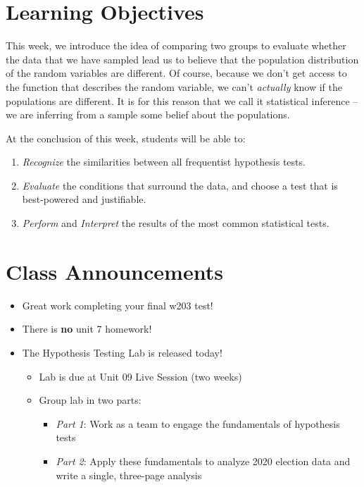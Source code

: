 \documentclass[
]{book}
\providecommand{\tightlist}{%
  \setlength{\itemsep}{0pt}\setlength{\parskip}{0pt}}
\theoremstyle{definition}
\theoremstyle{definition}
\theoremstyle{definition}
\theoremstyle{definition}
\theoremstyle{remark}
\begin{document}
\section{Learning Objectives}\label{learning-objectives-6}

This week, we introduce the idea of comparing two groups to evaluate whether the data that we have sampled lead us to believe that the population distribution of the random variables are different. Of course, because we don't get access to the function that describes the random variable, we can't \emph{actually} know if the populations are different. It is for this reason that we call it statistical inference -- we are inferring from a sample some belief about the populations.

At the conclusion of this week, students will be able to:

\begin{enumerate}
\def\labelenumi{\arabic{enumi}.}
\tightlist
\item
  \emph{Recognize} the similarities between all frequentist hypothesis tests.
\item
  \emph{Evaluate} the conditions that surround the data, and choose a test that is best-powered and justifiable.
\item
  \emph{Perform} and \emph{Interpret} the results of the most common statistical tests.
\end{enumerate}

\section{Class Announcements}\label{class-announcements-5}

\begin{itemize}
\tightlist
\item
  Great work completing your final w203 test!
\item
  There is \textbf{no} unit 7 homework!
\item
  The Hypothesis Testing Lab is released today!

  \begin{itemize}
  \tightlist
  \item
    Lab is due at Unit 09 Live Session (two weeks)
  \item
    Group lab in two parts:

    \begin{itemize}
    \tightlist
    \item
      \emph{Part 1}: Work as a team to engage the fundamentals of hypothesis tests
    \item
      \emph{Part 2}: Apply these fundamentals to analyze 2020 election data and write a single, three-page analysis
    \end{itemize}
  \end{itemize}
\end{itemize}
\end{document}
